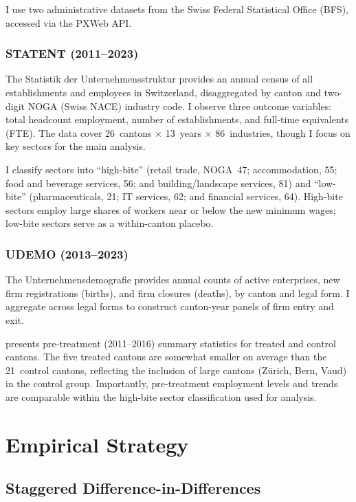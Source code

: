\documentclass[12pt]{article}
\begin{document}
I use two administrative datasets from the Swiss Federal Statistical Office (BFS), accessed via the PXWeb API.

\subsubsection*{STATENT (2011--2023)} The Statistik der Unternehmensstruktur provides an annual census of all establishments and employees in Switzerland, disaggregated by canton and two-digit NOGA (Swiss NACE) industry code. I observe three outcome variables: total headcount employment, number of establishments, and full-time equivalents (FTE). The data cover 26~cantons $\times$ 13~years $\times$ 86~industries, though I focus on key sectors for the main analysis.

I classify sectors into ``high-bite'' (retail trade, NOGA~47; accommodation, 55; food and beverage services, 56; and building/landscape services, 81) and ``low-bite'' (pharmaceuticals, 21; IT services, 62; and financial services, 64). High-bite sectors employ large shares of workers near or below the new minimum wages; low-bite sectors serve as a within-canton placebo.

\subsubsection*{UDEMO (2013--2023)} The Unternehmensdemografie provides annual counts of active enterprises, new firm registrations (births), and firm closures (deaths), by canton and legal form. I aggregate across legal forms to construct canton-year panels of firm entry and exit.

 presents pre-treatment (2011--2016) summary statistics for treated and control cantons. The five treated cantons are somewhat smaller on average than the 21~control cantons, reflecting the inclusion of large cantons (Z\"urich, Bern, Vaud) in the control group. Importantly, pre-treatment employment levels and trends are comparable within the high-bite sector classification used for analysis.



\section{Empirical Strategy}
\label{sec:empirical}

\subsection{Staggered Difference-in-Differences}
\end{document}
